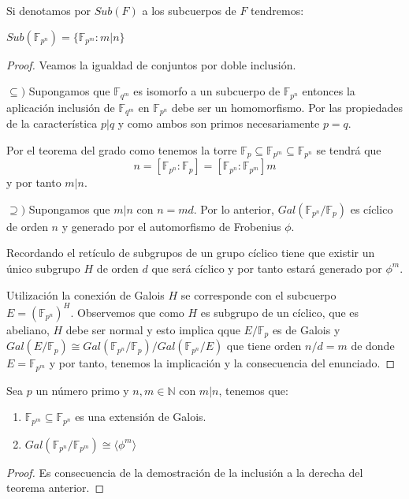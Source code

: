 \begin{proposition}
	Si denotamos por $Sub(F)$ a los subcuerpos de $F$ tendremos:
	
	$Sub(\mathbb{F}_{p^n}) = \{\mathbb{F}_{p^m}:m|n\}$
\end{proposition}
\begin{proof}
	Veamos la igualdad de conjuntos por doble inclusión. 
	
	$\subseteq)$ Supongamos que $\mathbb{F}_{q^m}$ es isomorfo a un subcuerpo de $\mathbb{F}_{p^n}$ entonces la aplicación inclusión de $\mathbb{F}_{q^m}$ en $\mathbb{F}_{p^n}$ debe ser un homomorfismo. Por las propiedades de la característica $p|q$ y como ambos son primos necesariamente $p = q$. 
	
	Por el teorema del grado como tenemos la torre $\mathbb{F}_{p} \subseteq \mathbb{F}_{p^m} \subseteq \mathbb{F}_{p^n}$ se tendrá que $$n = [\mathbb{F}_{p^n}:\mathbb{F}_{p}] = [\mathbb{F}_{p^n}:\mathbb{F}_{p^m}]m$$ y por tanto $m|n$. 
	
	$\supseteq)$ Supongamos que $m|n$ con $n = md$. Por lo anterior, $Gal(\mathbb{F}_{p^n}/\mathbb{F}_p)$ es cíclico de orden $n$ y generado por el automorfismo de Frobenius $\phi$. 
	
	Recordando el retículo de subgrupos de un grupo cíclico tiene que existir un único subgrupo $H$ de orden $d$ que será cíclico  y por tanto estará generado por $\phi^m$. 
	
	Utilización la conexión de Galois $H$ se corresponde con el subcuerpo $E = (\mathbb{F}_{p^n})^H$. Observemos que como $H$ es subgrupo de un cíclico, que es abeliano, $H$ debe ser normal y esto implica qque $E/\mathbb{F}_p$ es de Galois y $Gal(E/\mathbb{F}_p) \cong Gal(\mathbb{F}_{p^n}/\mathbb{F}_p)/Gal(\mathbb{F}_{p^n}/E)$ que tiene orden $n/d = m$ de donde $E = \mathbb{F}_{p^m}$ y por tanto, tenemos la implicación y la consecuencia del enunciado. 
\end{proof}

\begin{corollary}
 Sea $p$ un número primo y $n,m \in \mathbb{N}$ con $m|n$, tenemos que:
 
 \begin{enumerate}
 \item $\mathbb{F}_{p^m} \subseteq \mathbb{F}_{p^n}$ es una extensión de Galois. 
 \item $Gal(\mathbb{F}_{p^n} /\mathbb{F}_{p^m}) \cong \langle \phi^m \rangle$
 \end{enumerate}
\end{corollary}
\begin{proof}
Es consecuencia de la demostración de la inclusión a la derecha del teorema anterior. 
\end{proof}

